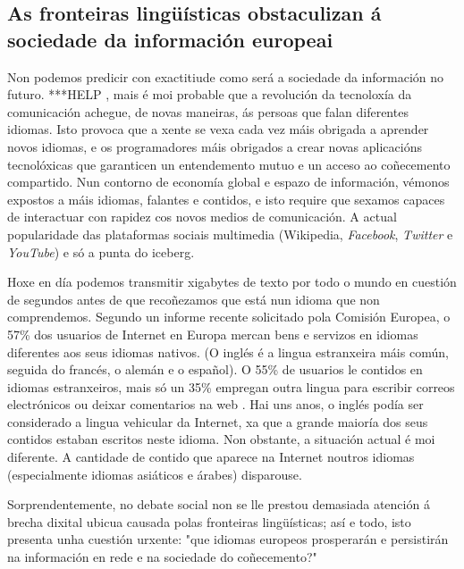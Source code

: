 \begin{multicols}{2}
\subsection{As fronteiras lingüísticas obstaculizan á sociedade da  información europeai}
  
 Non podemos predicir con exactitiude como será a sociedade da información no futuro. ***HELP , mais é moi probable que a revolución da tecnoloxía da comunicación achegue, de novas maneiras, ás persoas que falan diferentes idiomas. Isto provoca que a xente se vexa cada vez máis obrigada a aprender novos idiomas, e os programadores máis obrigados a crear novas aplicacións tecnolóxicas que garanticen un entendemento mutuo e un acceso ao coñecemento compartido. Nun contorno de economía global e espazo de información, vémonos expostos a máis idiomas, falantes e contidos, e isto require que sexamos capaces de interactuar con rapidez cos novos medios de comunicación. A actual popularidade das plataformas sociais multimedia (Wikipedia,  \textit{Facebook}, \textit{Twitter}  e \textit{YouTube}) e só a punta do iceberg.




Hoxe en día podemos transmitir xigabytes de texto por todo o mundo en cuestión de segundos antes de que recoñezamos que está nun idioma que non comprendemos. Segundo un informe recente solicitado pola Comisión Europea, o 57\% dos usuarios de Internet en Europa mercan bens e servizos en idiomas diferentes aos seus idiomas nativos. (O inglés é a lingua estranxeira máis común, seguida do francés, o alemán e o español). O 55\% de usuarios le contidos en idiomas estranxeiros, mais só un 35\% empregan outra lingua para escribir correos electrónicos ou deixar comentarios na web \cite{GAL-Nota1}.  Hai uns anos, o inglés podía ser considerado a lingua vehicular da Internet, xa que a grande maioría dos seus contidos estaban escritos neste idioma. Non obstante, a situación actual é moi diferente. A cantidade de contido que aparece na Internet noutros idiomas (especialmente idiomas asiáticos e árabes) disparouse.

Sorprendentemente, no debate social non se lle prestou demasiada atención á brecha dixital ubicua causada polas fronteiras lingüísticas; así e todo, isto presenta unha cuestión urxente: "que idiomas europeos prosperarán e persistirán na información en rede e na sociedade do coñecemento?"


\end{multicols}
